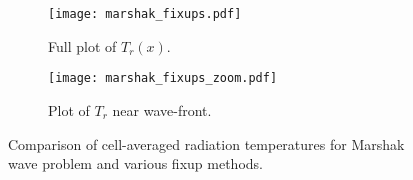 \begin{figure}
\begin{subfigure}{0.7\textwidth}
  \centering
    \texttt{[image: marshak\_fixups.pdf]}
    \caption{\label{fig:marshak_fix_full} Full plot of $T_r(x)$.}
\end{subfigure}
\vspace{0.2in}
\begin{subfigure}{0.7\textwidth}
  \centering
  \texttt{[image: marshak\_fixups\_zoom.pdf]}
  \caption{\label{fig:marshak_fix_zoom} Plot of $T_r$ near wave-front.}
\end{subfigure}
    \centering
    \caption{\label{fig:marshak_fix}Comparison of cell-averaged radiation temperatures for
Marshak wave problem and various fixup methods.}
\end{figure}





